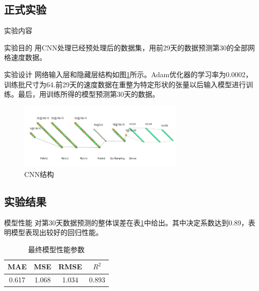 \documentclass[10pt]{beamer}
\begin{document}
\subsection{正式实验}
\begin{frame}{实验内容}
    \begin{block}{实验目的}
       用CNN处理已经预处理后的数据集，用前29天的数据预测第30的全部网格速度数据。
    \end{block}
    \begin{block}{实验设计}
       网络输入层和隐藏层结构如图\ref{tab.CNNstructure}所示。Adam优化器的学习率为0.0002，训练批尺寸为64.前29天的速度数据在重整为特定形状的张量以后输入模型进行训练。最后，用训练所得的模型预测第30天的数据。
       \begin{figure}
           \centering
           \includegraphics[width=8cm]{pic/cnn.png}
           \caption{CNN结构}
           \label{tab.CNNstructure}
       \end{figure}
    \end{block}
\end{frame}

\subsection{实验结果}
\begin{frame}{模型性能}
    对第30天数据预测的整体误差在表\ref{tab.finalPerformance}中给出。其中\alert{决定系数达到0.89}，表明模型表现出较好的回归性能。
    \begin{table}[h!]
        \centering
        \begin{tabular}{|c|c|c|c|}
        \hline
            MAE & MSE & RMSE & $R^2$ \\
            \hline
            0.617 & 1.068 & 1.034 & 0.893 \\
            \hline
        \end{tabular}
        \caption{最终模型性能参数}
        \label{tab.finalPerformance}
    \end{table}
\end{frame}
\end{document}
